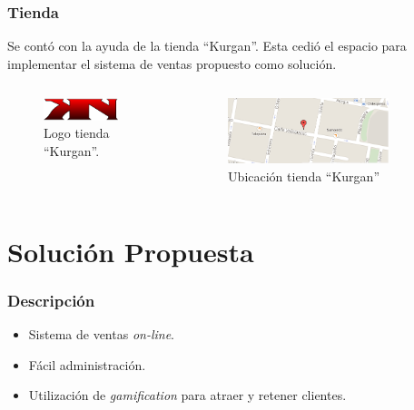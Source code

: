 \documentclass[10pt, compress]{beamer}
\begin{document}
\begin{frame}
 \frametitle{Tienda}

Se contó con la ayuda de la tienda ``Kurgan''. Esta cedió el espacio para implementar el sistema de ventas 
propuesto como solución.

\begin{columns}[onlytextwidth]
\begin{figure}
\centering
    \includegraphics[width=0.8\textwidth]{images/logo.png}
    \caption{Logo tienda ``Kurgan''.}
    \label{fig:awesome_image}
\end{figure}

\begin{figure}
\centering
    \includegraphics[width=0.8\textwidth]{images/mapa.png}
    \caption{Ubicación tienda ``Kurgan''}
    \label{fig:awesome_image}
\end{figure}

\end{columns}
\end{frame}

\section{Solución Propuesta}

\begin{frame}
 \frametitle{Descripción}

\begin{itemize}[<+- | alert@+>]
 \item Sistema de ventas \emph{on-line}.
 \item Fácil administración.
 \item Utilización de \emph{gamification} para atraer y retener clientes.
\end{itemize}
\end{frame}
\end{document}
